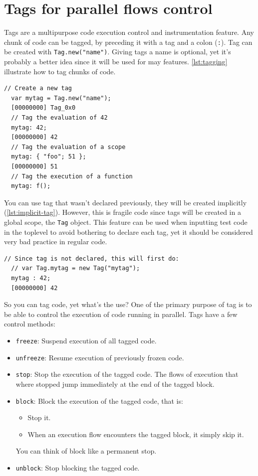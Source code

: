 \documentclass[openright,twoside,12pt]{report}
\newcommand{\lst}[1]{\autoref{lst:#1}}
\begin{document}
\section{Tags for parallel flows control}

Tags are a multipurpose code execution control and instrumentation
feature. Any chunk of code can be tagged, by preceding it with a tag
and a colon (\texttt{:}). Tag can be created with
\lstinline|Tag.new("name")|. Giving tags a name is optional, yet it's
probably a better idea since it will be used for may
features. \lst{tagging} illustrate how to tag chunks of code.

\begin{lstlisting}[caption=Tagging a block of code, label=lst:tagging]
  // Create a new tag
  var mytag = Tag.new("name");
  [00000000] Tag_0x0
  // Tag the evaluation of 42
  mytag: 42;
  [00000000] 42
  // Tag the evaluation of a scope
  mytag: { "foo"; 51 };
  [00000000] 51
  // Tag the execution of a function
  mytag: f();
\end{lstlisting}

You can use tag that wasn't declared previously, they will be created
implicitly (\lst{implicit-tag}). However, this is fragile code since
tags will be created in a global scope, the \texttt{Tag} object. This
feature can be used when inputting test code in the toplevel to avoid
bothering to declare each tag, yet it should be considered very bad
practice in regular code.

\begin{lstlisting}[caption=Tag created implicitly,
  label=lst:implicit-tag]
  // Since tag is not declared, this will first do:
  // var Tag.mytag = new Tag("mytag");
  mytag : 42;
  [00000000] 42
\end{lstlisting}

So you can tag code, yet what's the use? One of the primary purpose of
tag is to be able to control the execution of code running in
parallel. Tags have a few control methods:

\begin{itemize}
\item \texttt{freeze}: Suspend execution of all tagged code.
\item \texttt{unfreeze}: Resume execution of previously frozen code.
\item \texttt{stop}: Stop the execution of the tagged code. The flows
  of execution that where stopped jump immediately at the end of the
  tagged block.
\item \texttt{block}: Block the execution of the tagged code, that is:
  \begin{itemize}
  \item Stop it.
  \item When an execution flow encounters the tagged block, it simply
    skip it.
  \end{itemize}
  You can think of block like a permanent stop.
\item \texttt{unblock}: Stop blocking the tagged code.
\end{itemize}
\end{document}
